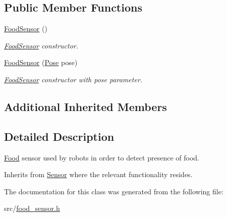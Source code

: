 \subsection*{Public Member Functions}
\begin{DoxyCompactItemize}
\item 
\hyperlink{classFoodSensor_a431673c0ca1757fc95a7d72db7955879}{Food\+Sensor} ()\hypertarget{classFoodSensor_a431673c0ca1757fc95a7d72db7955879}{}\label{classFoodSensor_a431673c0ca1757fc95a7d72db7955879}

\begin{DoxyCompactList}\small\item\em \hyperlink{classFoodSensor}{Food\+Sensor} constructor. \end{DoxyCompactList}\item 
\hyperlink{classFoodSensor_aa77d7a095b3d7730619c121de9116a03}{Food\+Sensor} (\hyperlink{structPose}{Pose} pose)\hypertarget{classFoodSensor_aa77d7a095b3d7730619c121de9116a03}{}\label{classFoodSensor_aa77d7a095b3d7730619c121de9116a03}

\begin{DoxyCompactList}\small\item\em \hyperlink{classFoodSensor}{Food\+Sensor} constructor with pose parameter. \end{DoxyCompactList}\end{DoxyCompactItemize}
\subsection*{Additional Inherited Members}


\subsection{Detailed Description}
\hyperlink{classFood}{Food} sensor used by robots in order to detect presence of food. 

Inherits from \hyperlink{classSensor}{Sensor} where the relevant functionality resides. 

The documentation for this class was generated from the following file\+:\begin{DoxyCompactItemize}
\item 
src/\hyperlink{food__sensor_8h}{food\+\_\+sensor.\+h}\end{DoxyCompactItemize}
